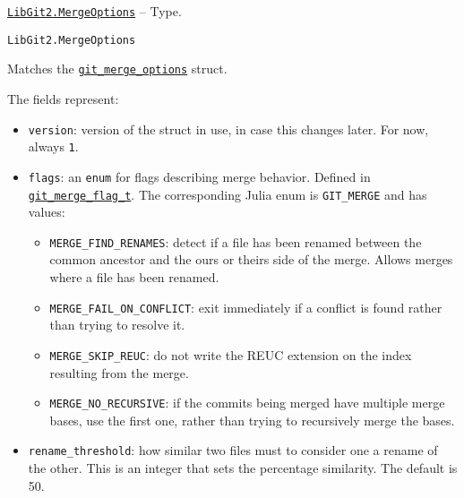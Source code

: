 \hypertarget{7663922722360889557}{} 
\hyperlink{7663922722360889557}{\texttt{LibGit2.MergeOptions}}  -- {Type.}

\begin{adjustwidth}{2em}{0pt}


\begin{verbatim}
LibGit2.MergeOptions
\end{verbatim}

Matches the \href{https://libgit2.org/libgit2/\#HEAD/type/git\_merge\_options}{\texttt{git\_merge\_options}} struct.

The fields represent:

\begin{itemize}
\item \texttt{version}: version of the struct in use, in case this changes later. For now, always \texttt{1}.


\item \texttt{flags}: an \texttt{enum} for flags describing merge behavior.  Defined in \href{https://github.com/libgit2/libgit2/blob/HEAD/include/git2/merge.h\#L95}{\texttt{git\_merge\_flag\_t}}.  The corresponding Julia enum is \texttt{GIT\_MERGE} and has values:

\begin{itemize}
\item \texttt{MERGE\_FIND\_RENAMES}: detect if a file has been renamed between the common ancestor and the {\textquotedbl}ours{\textquotedbl} or {\textquotedbl}theirs{\textquotedbl} side of the merge. Allows merges where a file has been renamed.


\item \texttt{MERGE\_FAIL\_ON\_CONFLICT}: exit immediately if a conflict is found rather than trying to resolve it.


\item \texttt{MERGE\_SKIP\_REUC}: do not write the REUC extension on the index resulting from the merge.


\item \texttt{MERGE\_NO\_RECURSIVE}: if the commits being merged have multiple merge bases, use the first one, rather than trying to recursively merge the bases.

\end{itemize}

\item \texttt{rename\_threshold}: how similar two files must to consider one a rename of the other. This is an integer that sets the percentage similarity. The default is 50.



\end{itemize}
\end{adjustwidth}
